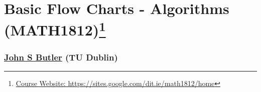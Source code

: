 \documentclass[10pt,a4paper]{article}
\begin{document}
\scriptsize


\section*{Basic Flow Charts - Algorithms  (MATH1812)\footnote{\href{https://sites.google.com/dit.ie/math1812/home}{Course Website: https://sites.google.com/dit.ie/math1812/home}}}
\subsubsection*{\href{johnsbutler.netlify.com}{John S Butler} (TU Dublin) }

\end{document}
